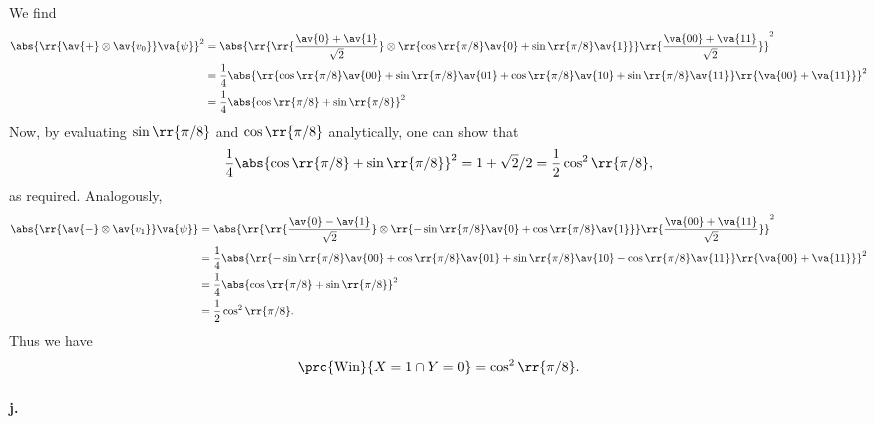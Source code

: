 \documentclass{article}
\begin{document}
We find
\begin{align*}
  \abs{\rr{\av{+}\otimes \av{v_0}}\va{\psi}}^2
  &= \abs{\rr{\rr{\frac{\av{0}+\av{1}}{\sqrt{2}}}\otimes\rr{\cos\rr{\pi/8}\av{0}+\sin\rr{\pi/8}\av{1}}}\rr{\frac{\va{00}+\va{11}}{\sqrt{2}}}}^2 \\
  &= \frac{1}{4}\abs{\rr{\cos\rr{\pi/8}\av{00} + \sin\rr{\pi/8}\av{01} + \cos\rr{\pi/8}\av{10}+\sin\rr{\pi/8}\av{11}}\rr{\va{00}+\va{11}}}^2 \\
  &= \frac{1}{4}\abs{\cos\rr{\pi/8}+\sin\rr{\pi/8}}^2
\end{align*}
Now, by evaluating $\sin\rr{\pi/8}$ and $\cos\rr{\pi/8}$ analytically, one can show that
\begin{align*}
  \frac{1}{4} \abs{\cos\rr{\pi/8}+\sin\rr{\pi/8}}^2 = 1 + \sqrt{2}/{2} = \frac{1}{2}\cos^2\rr{\pi/8},
\end{align*}
as required. Analogously,
\begin{align*}
  \abs{\rr{\av{-}\otimes \av{v_1}}\va{\psi}}
  &= \abs{\rr{\rr{\frac{\av{0}-\av{1}}{\sqrt{2}}}\otimes\rr{-\sin\rr{\pi/8}\av{0}+\cos\rr{\pi/8}\av{1}}}\rr{\frac{\va{00}+\va{11}}{\sqrt{2}}}}^2 \\
  &= \frac{1}{4}\abs{\rr{-\sin\rr{\pi/8}\av{00} + \cos\rr{\pi/8}\av{01} + \sin\rr{\pi/8}\av{10}-\cos\rr{\pi/8}\av{11}}\rr{\va{00}+\va{11}}}^2 \\
  &= \frac{1}{4}\abs{\cos\rr{\pi/8}+\sin\rr{\pi/8}}^2 \\
  &= \frac{1}{2}\cos^2\rr{\pi/8}.
\end{align*}
Thus we have
\begin{align*}
  \prc{\text{Win}}{X=1\cap Y=0} = \cos^2\rr{\pi/8}.
\end{align*}

\paragraph{j.}
\end{document}
